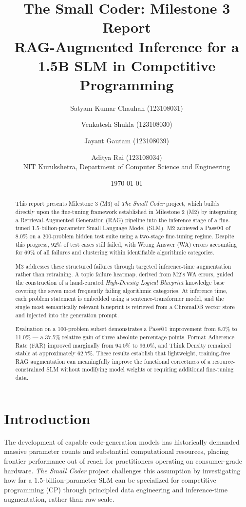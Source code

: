 \documentclass[12pt,a4paper]{article}
\title{\textbf{The Small Coder: Milestone 3 Report}\\[0.4em]
\large RAG-Augmented Inference for a 1.5B SLM in Competitive Programming}
\author{Satyam Kumar Chauhan (123108031) \and Venkatesh Shukla (123108030)\and Jayant Gautam (123108039) \and Aditya Rai (123108034)\\[0.3em]
\small NIT Kurukshetra, Department of Computer Science and Engineering}
\date{\today}
\begin{document}
\maketitle
\thispagestyle{empty}
\newpage

\tableofcontents
\newpage

\begin{abstract}
\noindent
This report presents Milestone 3 (M3) of \textit{The Small Coder} project, which builds directly upon the fine-tuning framework established in Milestone 2 (M2) by integrating a Retrieval-Augmented Generation (RAG) pipeline into the inference stage of a fine-tuned 1.5-billion-parameter Small Language Model (SLM). M2 achieved a Pass@1 of 8.0\% on a 200-problem hidden test suite using a two-stage fine-tuning regime. Despite this progress, 92\% of test cases still failed, with Wrong Answer (WA) errors accounting for 69\% of all failures and clustering within identifiable algorithmic categories.

M3 addresses these structured failures through targeted inference-time augmentation rather than retraining. A topic failure heatmap, derived from M2's WA errors, guided the construction of a hand-curated \textit{High-Density Logical Blueprint} knowledge base covering the seven most frequently failing algorithmic categories. At inference time, each problem statement is embedded using a sentence-transformer model, and the single most semantically relevant blueprint is retrieved from a ChromaDB vector store and injected into the generation prompt.

Evaluation on a 100-problem subset demonstrates a Pass@1 improvement from 8.0\% to 11.0\% --- a 37.5\% relative gain of three absolute percentage points. Format Adherence Rate (FAR) improved marginally from 94.0\% to 96.0\%, and Think Density remained stable at approximately 62.7\%. These results establish that lightweight, training-free RAG augmentation can meaningfully improve the functional correctness of a resource-constrained SLM without modifying model weights or requiring additional fine-tuning data.
\end{abstract}

\newpage

\section{Introduction}

The development of capable code-generation models has historically demanded massive parameter counts and substantial computational resources, placing frontier performance out of reach for practitioners operating on consumer-grade hardware. \textit{The Small Coder} project challenges this assumption by investigating how far a 1.5-billion-parameter SLM can be specialized for competitive programming (CP) through principled data engineering and inference-time augmentation, rather than raw scale.
\end{document}
